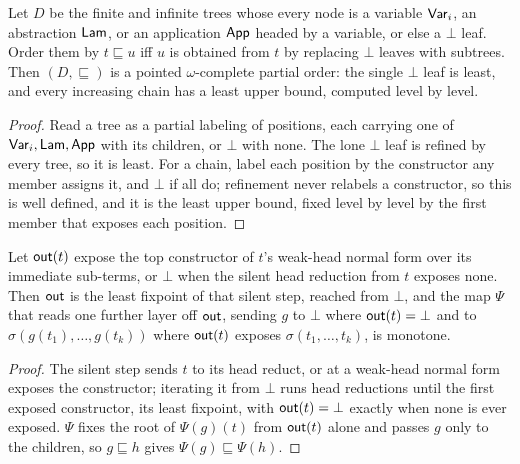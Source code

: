 \begin{lemma}\label{lem:order-llt}
  Let $D$ be the finite and infinite trees whose every node is a variable $\mathsf{Var}_i$, an abstraction
  $\mathsf{Lam}$, or an application $\mathsf{App}$ headed by a variable, or else a $\bot$ leaf. Order them by
  $t \sqsubseteq u$ iff $u$ is obtained from $t$ by replacing $\bot$ leaves with subtrees. Then
  $(D, \sqsubseteq)$ is a pointed $\omega$-complete partial order: the single $\bot$ leaf is least, and
  every increasing chain has a least upper bound, computed level by level.
\end{lemma}
\begin{proof}
  Read a tree as a partial labeling of positions, each carrying one of $\mathsf{Var}_i, \mathsf{Lam}, \mathsf{App}$
  with its children, or $\bot$ with none. The lone $\bot$ leaf is refined by every tree, so it is
  least. For a chain, label each position by the constructor any member assigns it, and $\bot$ if all
  do; refinement never relabels a constructor, so this is well defined, and it is the least upper
  bound, fixed level by level by the first member that exposes each position.
\end{proof}

\begin{lemma}\label{lem:mono-llt}
  Let $\mathsf{out}(t)$ expose the top constructor of $t$'s weak-head normal form over its immediate sub-terms, or $\bot$ when the silent head reduction from $t$ exposes none. Then $\mathsf{out}$ is the least fixpoint of that silent step, reached from $\bot$, and the map $\Psi$ that reads one further layer off $\mathsf{out}$, sending $g$ to $\bot$ where $\mathsf{out}(t) = \bot$ and to $\sigma(g(t_1), \dots, g(t_k))$ where $\mathsf{out}(t)$ exposes $\sigma(t_1, \dots, t_k)$, is monotone.
\end{lemma}
\begin{proof}
  The silent step sends $t$ to its head reduct, or at a weak-head normal form exposes the constructor; iterating it from $\bot$ runs head reductions until the first exposed constructor, its least fixpoint, with $\mathsf{out}(t) = \bot$ exactly when none is ever exposed. $\Psi$ fixes the root of $\Psi(g)(t)$ from $\mathsf{out}(t)$ alone and passes $g$ only to the children, so $g \sqsubseteq h$ gives $\Psi(g) \sqsubseteq \Psi(h)$.
\end{proof}

